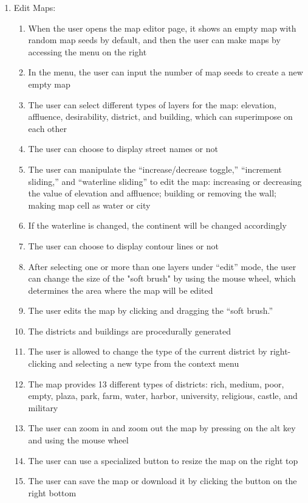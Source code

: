 \begin{enumerate}
\begin{enumerate}
    \item Edit Maps:
    \begin{enumerate}
      \item When the user opens the map editor page, it shows an empty map with random map seeds by default, and then the user can make maps by accessing the menu on the right
    	\item In the menu, the user can input the number of map seeds to create a new empty map
    	\item The user can select different types of layers for the map: elevation, affluence, desirability, district, and building, which can superimpose on each other
      \item The user can choose to display street names or not
      \item The user can manipulate the ``increase/decrease toggle,'' ``increment sliding,'' and ``waterline sliding'' to edit the map: increasing or decreasing the value of elevation and affluence; building or removing the wall; making map cell as water or city
      \item If the waterline is changed, the continent will be changed accordingly
      \item The user can choose to display contour lines or not
      \item After selecting one or more than one layers under ``edit'' mode, the user can change the size of the "soft brush" by using the mouse wheel, which determines the area where the map will be edited
      \item The user edits the map by clicking and dragging the ``soft brush.''
      \item The districts and buildings are procedurally generated
      \item The user is allowed to change the type of the current district by right-clicking and selecting a new type from the context menu
      \item The map provides 13 different types of districts: rich, medium, poor, empty, plaza, park, farm, water, harbor, university, religious, castle, and military
      \item The user can zoom in and zoom out the map by pressing on the alt key and using the mouse wheel
      \item The user can use a specialized button to resize the map on the right top
      \item The user can save the map or download it by clicking the button on the right bottom
    \end{enumerate}
  \end{enumerate}
\end{enumerate}

